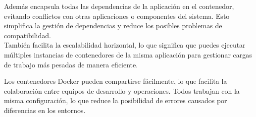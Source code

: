 Además encapsula todas las dependencias de la aplicación en el contenedor, 
evitando conflictos con otras aplicaciones o componentes del sistema. 
Esto simplifica la gestión de dependencias y reduce los posibles problemas de compatibilidad. \\
También facilita la escalabilidad horizontal, lo que significa que puedes 
ejecutar múltiples instancias de contenedores de la misma aplicación para 
gestionar cargas de trabajo más pesadas de manera eficiente.

Los contenedores Docker pueden compartirse fácilmente, lo que facilita la colaboración 
entre equipos de desarrollo y operaciones. 
Todos trabajan con la misma configuración, lo que reduce la posibilidad de errores 
causados por diferencias en los entornos.
